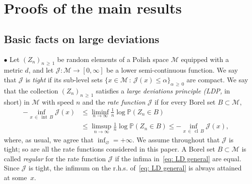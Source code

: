 \documentclass[10pt]{amsart}
\theoremstyle{definition}\newtheorem{defi}[theo]{Definition}\newtheorem{rema}[theo]{Remark}\newtheorem{exam}[theo]{Example}\newtheorem{exem}[theo]{Example}\newtheorem{nota}[theo]{Notation}
\DeclareMathOperator{\cl}{cl}
\DeclareMathOperator{\intr}{int}
\newcommand{\Pbb}{\mathbb{P}}
\newcommand{\Jcl}{\mathcal{J}}
\newcommand{\Mcl}{\mathcal{M}}
\begin{document}
\section{Proofs of the main results} \label{Sec: proof}
\subsection{Basic facts on large deviations} \label{Sec: basics on LDP}



$\bullet$ Let $(Z_n)_{n\,\ge\,1}$ be random elements of a Polish space $\Mcl$ equipped with a metric $d$, and let $\Jcl:\Mcl\to[0,\infty]$ be a lower semi-continuous function. We say that $\Jcl$ is \emph{tight} if its sub-level sets $\{x\in \Mcl \,:\, \Jcl(x) \leq \alpha \}_{\alpha\,\ge\,0}$ are compact. We say that the collection $(Z_n)_{n\,\ge\,1}$ satisfies a \emph{large deviations principle (LDP,} in short) in $\Mcl$ with speed $n$ and the \emph{rate function} $\Jcl$ if for every Borel set $B\subset \Mcl$,
\begin{equation}\label{eq: LD general}
\begin{aligned}
-\inf_{x\,\in\,\intr\,B}\Jcl(x) &\leq\liminf_{n\to\infty} \frac1n \log \Pbb\left(Z_n\in B\right) \\
&\leq\limsup_{n\to\infty} \frac1n \log \Pbb\left(Z_n\in B\right) \leq-\inf_{x\,\in\,\cl\,B}\Jcl(x),
\end{aligned}
\end{equation}
where, as usual, we agree that $\inf_\varnothing = +\infty$. We assume throughout that $\Jcl$ is tight; so are all the rate functions considered in this paper. A Borel set $B \subset \Mcl$ is called \emph{regular} for the rate function $\Jcl$ if the infima in~\eqref{eq: LD general} are equal. Since $\Jcl$ is tight, the infimum on the r.h.s. of~\eqref{eq: LD general} is always attained at some~$x$.
\end{document}

